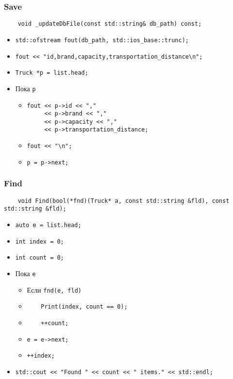 \subsubsection*{Save}

\begin{lstlisting}
	void _updateDbFile(const std::string& db_path) const;
\end{lstlisting}

\begin{itemize}
	\item \verb|std::ofstream fout(db_path, std::ios_base::trunc);|
	\item \verb|fout << "id,brand,capacity,transportation_distance\n";|
	\item \verb|Truck *p = list.head;|
	\item Пока \verb|p|
	\begin{itemize}
		\item 
		\verb|fout << p->id << ","|\\
		\verb|     << p->brand << ","|\\
		\verb|     << p->capacity << ","|\\
		\verb|     << p->transportation_distance;|
		\item \verb|fout << "\n";|
		\item \verb|p = p->next;|
	\end{itemize}
\end{itemize}



\subsubsection*{Find}

\begin{lstlisting}
    void Find(bool(*fnd)(Truck* a, const std::string &fld), const std::string &fld);
\end{lstlisting}

\begin{itemize}
	\item \verb|auto e = list.head;|
    \item \verb|int index = 0;|
    \item \verb|int count = 0;|
	\item Пока \verb|e|
		\begin{itemize}
			\item Если \verb|fnd(e, fld) |
			\item \verb|    Print(index, count == 0);|
			\item \verb|    ++count;|
			\item \verb|e = e->next;|
			\item \verb|++index;|
		\end{itemize}
    \item \verb|std::cout << "Found " << count << " items." << std::endl;|
\end{itemize}



